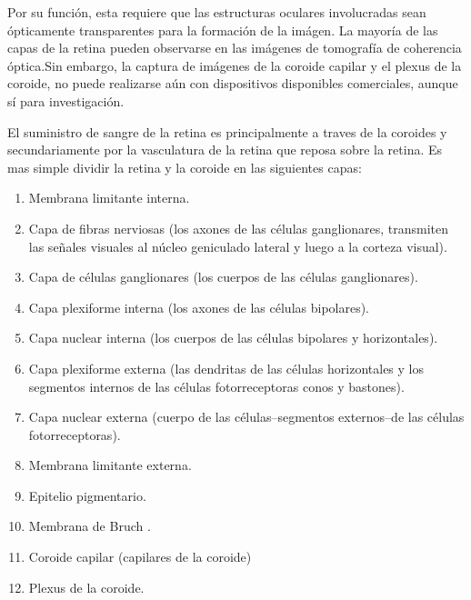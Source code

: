 Por su funci\'on, esta requiere que las estructuras oculares involucradas sean \'opticamente transparentes para la formaci\'on de la im\'agen.
La mayor\'ia de las capas de la retina pueden observarse en las im\'agenes de tomografía de coherencia óptica.Sin embargo, la captura de imágenes de la coroide capilar y el plexus de la coroide, no puede realizarse aún con dispositivos disponibles comerciales, aunque sí para investigación.\cite{abramoff2010retinal}

El suministro de sangre de la retina es principalmente a traves de la coroides y secundariamente por la vasculatura de la retina que reposa sobre la retina. Es mas simple dividir la retina y la coroide en las siguientes capas:
\begin{enumerate}[1.]
    \item Membrana limitante interna.
    \item Capa de fibras nerviosas (los axones de las células ganglionares, transmiten las señales visuales al núcleo geniculado lateral y luego a la corteza visual).
    \item Capa de células ganglionares (los cuerpos de las células ganglionares).
    \item	Capa plexiforme interna (los axones de las células bipolares).
	\item Capa nuclear interna (los cuerpos de las células bipolares y horizontales).
	\item Capa plexiforme externa (las dendritas de las células horizontales y los segmentos internos de las células fotorreceptoras conos y bastones).
	\item Capa nuclear externa (cuerpo de las células--segmentos externos--de las células fotorreceptoras).
	\item Membrana limitante externa.
	\item Epitelio pigmentario.
	\item Membrana de Bruch .
	\item Coroide capilar (capilares de la coroide)
	\item Plexus de la coroide.

\end{enumerate}

